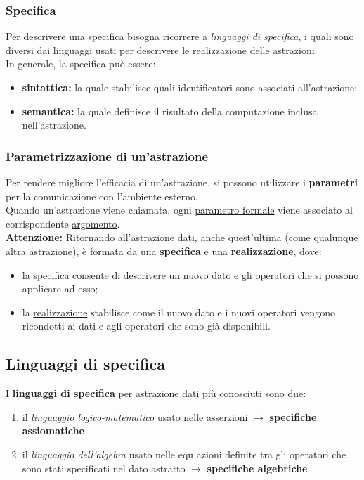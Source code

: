 \documentclass{article}
\begin{document}
	\subsubsection{Specifica}
	Per descrivere una specifica bisogna ricorrere a \textit{linguaggi di specifica}, i quali sono diversi dai linguaggi usati per descrivere le realizzazione delle astrazioni.
	\vspace{\baselineskip} \\
	In generale, la specifica può essere:
	\begin{itemize}
		\item \textbf{sintattica:} la quale stabilisce quali identificatori sono associati \newline all'astrazione;
		\item \textbf{semantica:} la quale definisce il risultato della computazione inclusa \newline nell'astrazione.
	\end{itemize} 
	
	\subsubsection{Parametrizzazione di un'astrazione}
	Per rendere migliore l'efficacia di un'astrazione, si possono utilizzare i \textbf{parametri} per la comunicazione con l'ambiente esterno. \\
	Quando un'astrazione viene chiamata, ogni \underline{parametro formale} viene associato al corrispondente \underline{argomento}.
	\vspace{\baselineskip} \\
	\textbf{Attenzione:} Ritornando all'astrazione dati, anche quest'ultima (come qualunque altra astrazione), è formata da una \textbf{specifica} e una \textbf{realizzazione}, dove:
	\begin{itemize}
		\item la \underline{specifica} consente di descrivere un nuovo dato e gli operatori che si possono applicare ad esso;
		\item la \underline{realizzazione} stabilisce come il nuovo dato e i nuovi operatori vengono ricondotti ai dati e agli operatori che sono già disponibili.
	\end{itemize} 
	
	\subsection{Linguaggi di specifica}
	I \textbf{linguaggi di specifica} per astrazione dati più conosciuti sono due:
	\begin{enumerate}
		\item il \textit{linguaggio logico-matematico} usato nelle asserzioni $\rightarrow$ \textbf{specifiche assiomatiche}
		\item il \textit{linguaggio dell'algebra} usato nelle equ azioni definite tra gli operatori che sono stati specificati nel dato astratto $\rightarrow$ \textbf{specifiche algebriche}
	\end{enumerate}
	
\end{document}
